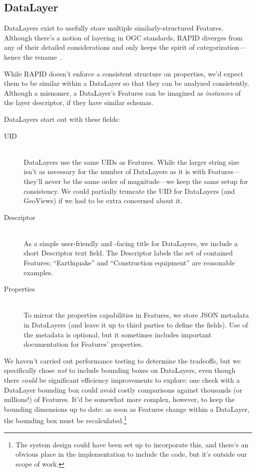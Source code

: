 \subsection{DataLayer}
DataLayers exist to usefully store multiple similarly-structured Features. Although there's a notion of layering in OGC standards, RAPID diverges from any of their detailed considerations and only keeps the spirit of categorization---hence the rename~\cite{AbstractSpecFaq,SFA,WFS}.

While RAPID doesn't enforce a consistent structure on properties, we'd expect them to be similar within a DataLayer so that they can be analyzed consistently. Although a misnomer, a DataLayer's Features can be imagined as \textit{instances} of the layer descriptor, if they have similar schemas.

DataLayers start out with these fields:

\begin{description}

\item[UID] \hfill \\
DataLayers use the same UIDs as Features. While the larger string size isn't as necessary for the number of DataLayers as it is with Features---they'll never be the same order of magnitude---we keep the same setup for consistency. We could partially truncate the UID for DataLayers (and GeoViews) if we had to be extra concerned about it.

\item[Descriptor] \hfill \\
As a simple user-friendly and -facing title for DataLayers, we include a short Descriptor text field. The Descriptor labels the set of contained Features; ``Earthquake'' and ``Construction equipment'' are reasonable examples.

\item[Properties] \hfill \\
To mirror the properties capabilities in Features, we store JSON metadata in DataLayers (and leave it up to third parties to define the fields). Use of the metadata is optional, but it sometimes includes important documentation for Features' properties.
  
\end{description}

 We haven't carried out performance testing to determine the tradeoffs, but we specifically chose \textit{not} to include bounding boxes on DataLayers, even though there \textit{could} be significant efficiency improvements to explore: one check with a DataLayer bounding box could avoid costly comparisons against thousands (or millions!) of Features. It'd be somewhat more complex, however, to keep the bounding dimensions up to date: as soon as Features change within a DataLayer, the bounding box must be recalculated.\footnote{The system design could have been set up to incorporate this, and there's an obvious place in the implementation to include the code, but it's outside our scope of work.}

